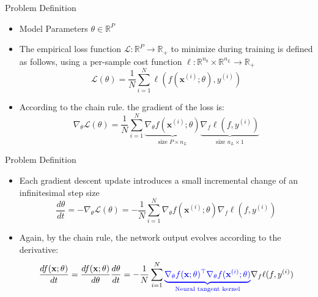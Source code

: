 \documentclass[serif, aspectratio=169]{beamer}
\begin{document}
\begin{frame}{Problem Definition}
	
	\begin{itemize}
		\item Model Parameters \(\theta \in \mathbb{R}^P\)
		
		\item The empirical loss function \(\mathcal{L}: \mathbb{R}^P \to \mathbb{R}_+\)
		to minimize during training is defined as follows, using a per-sample cost function \(\ell: \mathbb{R}^{n_0} \times \mathbb{R}^{n_L} \to \mathbb{R}_+\)
		\[
		\mathcal{L}(\theta) =\frac{1}{N} \sum_{i=1}^N \ell(f(\mathbf{x}^{(i)}; \theta), y^{(i)})
		\]
		\item  According to the chain rule. the gradient of the loss is:
		\[
		\nabla_\theta \mathcal{L}(\theta)= \frac{1}{N} \sum_{i=1}^N \underbrace{\nabla_\theta f(\mathbf{x}^{(i)}; \theta)}_{\text{size }P \times n_L} 
		\underbrace{\nabla_f \ell(f, y^{(i)})}_{\text{size } n_L \times 1}
		\]
		
	\end{itemize}
\end{frame}


\begin{frame}{Problem Definition}
	
	\begin{itemize}
		\item Each gradient descent update introduces a small incremental change of an infinitesimal step size
		\[
		\frac{d\theta}{d t} = - \nabla_\theta\mathcal{L}(\theta)  = -\frac{1}{N} \sum_{i=1}^N \nabla_\theta f(\mathbf{x}^{(i)}; \theta) \nabla_f \ell(f, y^{(i)})
		\] 
		\item Again, by the chain rule, the network output evolves according to the derivative:
		\[
		\frac{df(\mathbf{x};\theta)}{dt} 
		= \frac{df(\mathbf{x};\theta)}{d\theta}\frac{d\theta}{dt}
		= -\frac{1}{N} \sum_{i=1}^N \color{blue}{\underbrace{\nabla_\theta f(\mathbf{x};\theta)^\top \nabla_\theta f(\mathbf{x}^{(i)}; \theta)}_\text{Neural tangent kernel}} \color{black}{\nabla_f \ell(f, y^{(i)})}
		\]
		
	\end{itemize}
\end{frame}
\end{document}
